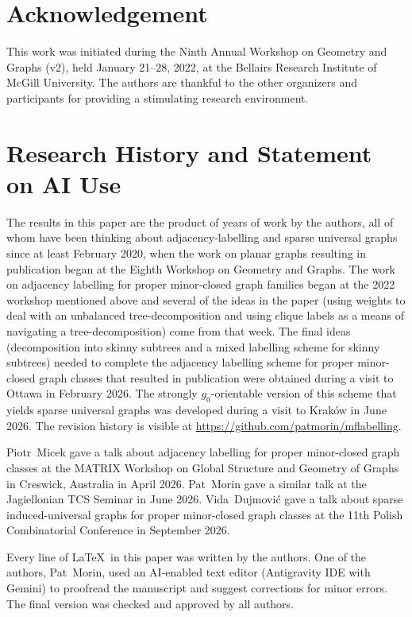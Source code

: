 \documentclass{patmorin}
\begin{document}
\section*{Acknowledgement} 
This work was initiated during the Ninth Annual Workshop on Geometry and Graphs (v2), held January 21--28, 2022, at the Bellairs Research Institute of McGill University.  The authors are thankful to the other organizers and participants for providing a stimulating research environment.

\section*{Research History and Statement on AI Use}

The results in this paper are the product of years of work by the authors, all of whom have been thinking about adjacency-labelling and sparse universal graphs since at least February 2020, when the work on planar graphs resulting in publication \cite{dujmovic.esperet.ea:adjacency} began at the Eighth Workshop on Geometry and Graphs.  The work on adjacency labelling for proper minor-closed graph families began at the 2022 workshop mentioned above and several of the ideas in the paper (using weights to deal with an unbalanced tree-decomposition and using clique labels as a means of navigating a tree-decomposition) come from that week.  The final ideas (decomposition into skinny subtrees and a mixed labelling scheme for skinny subtrees) needed to complete the adjacency labelling scheme for proper minor-closed graph classes that resulted in publication \cite{dujmovic.gavoille.ea:adjacency_minor} were obtained during a visit to Ottawa in February 2026.  The strongly $g_0$-orientable version of this scheme that yields sparse universal graphs was developed during a visit to Kraków in June 2026.  The revision history is visible at \url{https://github.com/patmorin/mflabelling}.

Piotr~Micek gave a talk about adjacency labelling for proper minor-closed graph classes at the MATRIX Workshop on Global Structure and Geometry of Graphs in Creswick, Australia in April 2026. Pat~Morin gave a similar talk at the Jagiellonian TCS Seminar in June 2026.  Vida~Dujmović gave a talk about sparse induced-universal graphs for proper minor-closed graph classes at the 11th Polish Combinatorial Conference in September 2026.

Every line of \LaTeX\ in this paper was written by the authors. One of the authors, Pat~Morin, used an AI-enabled text editor (Antigravity IDE with Gemini) to proofread the manuscript and suggest corrections for minor errors.  The final version was checked and approved by all authors.
\end{document}
